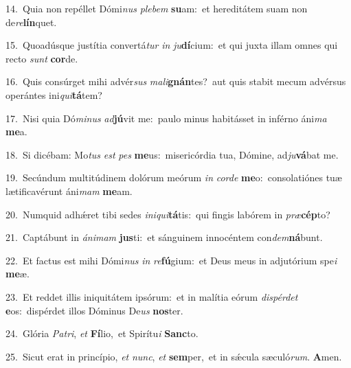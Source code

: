 {\numbfont\textcolor{\numbcolor}{14.}}~Quia non repéllet Dómi\textit{nus} \textit{ple}\-\textit{bem} \textbf{su}\-am:~\star et hereditátem suam non de\-\textit{re}\-\textbf{lín}quet.\par
{\numbfont\textcolor{\numbcolor}{15.}}~Quoadúsque justítia convertá\textit{tur} \textit{in} \textit{ju}\-\textbf{dí}cium:~\star et qui juxta illam omnes qui recto \textit{sunt} \textbf{cor}\-de.\par
{\numbfont\textcolor{\numbcolor}{16.}}~Quis consúrget mihi advér\textit{sus} \textit{ma}\-\textit{li}\textbf{gnán}tes?~\star aut quis stabit mecum advérsus operántes ini\-\textit{qui}\-\textbf{tá}tem?\par
{\numbfont\textcolor{\numbcolor}{17.}}~Nisi quia Dó\-\textit{mi}\-\textit{nus} \textit{ad}\-\textbf{jú}vit me:~\star paulo minus habitásset in inférno áni\textit{ma} \textbf{me}\-a.\par
{\numbfont\textcolor{\numbcolor}{18.}}~Si dicébam: Mo\textit{tus} \textit{est} \textit{pes} \textbf{me}\-us:~\star misericórdia tua, Dómine, ad\-\textit{ju}\-\textbf{vá}bat me.\par
{\numbfont\textcolor{\numbcolor}{19.}}~Secúndum multitúdinem dolórum meórum \textit{in} \textit{cor}\-\textit{de} \textbf{me}\-o:~\star consolatiónes tuæ lætificavérunt áni\textit{mam} \textbf{me}\-am.\par
{\numbfont\textcolor{\numbcolor}{20.}}~Numquid adhǽret tibi sedes \textit{in}\-\textit{i}\textit{qui}\textbf{tá}tis:~\star qui fingis labórem in \textit{præ}\-\textbf{cép}to?\par
{\numbfont\textcolor{\numbcolor}{21.}}~Captábunt in \textit{á}\-\textit{ni}\textit{mam} \textbf{jus}\-ti:~\star et sánguinem innocéntem con\-\textit{dem}\-\textbf{ná}bunt.\par
{\numbfont\textcolor{\numbcolor}{22.}}~Et factus est mihi Dómi\textit{nus} \textit{in} \textit{re}\-\textbf{fú}gium:~\star et Deus meus in adjutórium spe\textit{i} \textbf{me}\-æ.\par
{\numbfont\textcolor{\numbcolor}{23.}}~Et reddet illis iniquitátem ipsórum:~\dagger et in malítia eórum \textit{dis}\-\textit{pér}\textit{det} \textbf{e}\-os:~\star dispérdet illos Dóminus De\textit{us} \textbf{nos}\-ter.\par
{\numbfont\textcolor{\numbcolor}{24.}}~Glória \textit{Pa}\-\textit{tri}, \textit{et} \textbf{Fí}\-lio,~\star et Spirítu\textit{i} \textbf{Sanc}\-to.\par
{\numbfont\textcolor{\numbcolor}{25.}}~Sicut erat in princípio, \textit{et} \textit{nunc}\-, \textit{et} \textbf{sem}\-per,~\star et in sǽcula sæculó\-\textit{rum}\-. \textbf{A}\-men.\par
